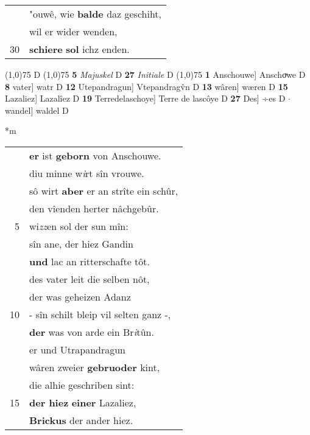 \documentclass[8pt,a4paper,notitlepage]{article}
\begin{document}
\begin{table}[ht]
\begin{minipage}[t]{0.5\linewidth}
\begin{tabular}{rl}
 & "ouwê, wie \textbf{balde} daz geschiht,\\ 
 & wil er wider wenden,\\ 
30 & \textbf{schiere} \textbf{sol} ichz enden.\\ 
\end{tabular}
\scriptsize
\line(1,0){75} \newline
D \newline
\line(1,0){75} \newline
\textbf{5} \textit{Majuskel} D  \textbf{27} \textit{Initiale} D  \newline
\line(1,0){75} \newline
\textbf{1} Anschouwe] Anschoͮwe D \textbf{8} vater] watr D \textbf{12} Utepandragun] Vtepandragv̂n D \textbf{13} wâren] wæren D \textbf{15} Lazaliez] Lazalîez D \textbf{19} Terredelaschoye] Terre de lascôye D \textbf{27} Des] ÷es D  $\cdot$ wandel] waldel D \newline
\end{minipage}
\hspace{0.5cm}
\begin{minipage}[t]{0.5\linewidth}
\small
\begin{center}*m
\end{center}
\begin{tabular}{rl}
 & \textbf{er} ist \textbf{geborn} von Anschouwe.\\ 
 & diu minne w\textit{i}rt sîn vrouwe.\\ 
 & sô wirt \textbf{aber} er an strîte ein schûr,\\ 
 & den vîenden herter nâchgebûr.\\ 
5 & wi\textit{zz}en sol der sun mîn:\\ 
 & sîn ane, der hiez Gandin\\ 
 & \textbf{und} lac an ritterschafte tôt.\\ 
 & des vater leit die selben nôt,\\ 
 & der was geheizen Adanz\\ 
10 & - sîn schilt bleip vil selten ganz -,\\ 
 & \textbf{der} was von arde ein Br\textit{i}tûn.\\ 
 & er und Utrapandragun\\ 
 & wâren zweier \textbf{gebruoder} kint,\\ 
 & die alhie geschriben sint:\\ 
15 & \textbf{der hiez} \textbf{einer} Lazaliez,\\ 
 & \textbf{Brickus} der ander hiez.\\ 

\end{tabular}
\end{minipage}
\end{table}
\end{document}
